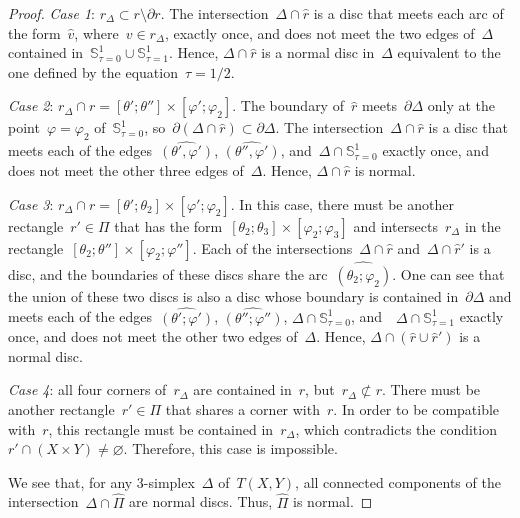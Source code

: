 \documentclass{amsart}
\theoremstyle{theorem}
\theoremstyle{remark}
\theoremstyle{definition}
\numberwithin{equation}{section}
\numberwithin{figure}{section}
\begin{document}
\begin{proof}
\smallskip\noindent\emph{Case 1}: $r_\Delta\subset r\setminus\partial r$.
The intersection~$\Delta\cap\widehat r$ is a disc that meets each arc of the form~$\widehat v$, where~$v\in r_\Delta$,
exactly once, and does not meet the two edges of~$\Delta$ contained in~$\mathbb S^1_{\tau=0}\cup\mathbb
S^1_{\tau=1}$.
Hence, $\Delta\cap\widehat r$ is a normal disc in~$\Delta$ equivalent to the one defined by the equation~$\tau=1/2$.

\smallskip\noindent\emph{Case 2}: $r_\Delta\cap r=[\theta';\theta'']\times[\varphi';\varphi_2]$.
The boundary of~$\widehat r$ meets~$\partial\Delta$ only at the point~$\varphi=\varphi_2$ of~$\mathbb S^1_{\tau=0}$,
so~$\partial(\Delta\cap\widehat r)\subset\partial\Delta$.
The intersection~$\Delta\cap\widehat r$ is a disc that meets each of the edges~$\widehat{(\theta',\varphi')}$,
$\widehat{(\theta'',\varphi')}$, and~$\Delta\cap\mathbb S^1_{\tau=0}$ exactly once,
and does not meet the other three edges of~$\Delta$. Hence, $\Delta\cap\widehat r$ is normal.

\smallskip\noindent\emph{Case 3}: $r_\Delta\cap r=[\theta';\theta_2]\times[\varphi';\varphi_2]$.
In this case, there must be another rectangle~$r'\in\Pi$ that has the form~$[\theta_2;\theta_3]\times[\varphi_2;\varphi_3]$
and intersects~$r_\Delta$ in the rectangle~$[\theta_2;\theta'']\times[\varphi_2;\varphi'']$.
Each of the intersections~$\Delta\cap\widehat r$ and~$\Delta\cap\widehat r'$ is a disc, and the boundaries
of these discs share the arc~$\widehat{(\theta_2;\varphi_2)}$. One can see that the union of these two discs
is also a disc whose boundary is contained in~$\partial\Delta$ and
meets each of the edges~$\widehat{(\theta';\varphi')}$, $\widehat{(\theta'';\varphi'')}$,
$\Delta\cap\mathbb S^1_{\tau=0}$, and~~$\Delta\cap\mathbb S^1_{\tau=1}$ exactly once,
and does not meet the other two edges of~$\Delta$. Hence, $\Delta\cap(\widehat r\cup\widehat r')$
is a normal disc.

\smallskip\noindent\emph{Case 4}: all four corners of~$r_\Delta$ are contained in~$r$, but~$r_\Delta\not\subset r$.
There must be another rectangle~$r'\in\Pi$ that shares a corner with~$r$. In order to be compatible with~$r$,
this rectangle must be contained in~$r_\Delta$, which contradicts the condition~$r'\cap(X\times Y)\ne\varnothing$.
Therefore, this case is impossible.

\smallskip
We see that, for any $3$-simplex~$\Delta$ of~$T(X,Y)$,
all connected components of the intersection~$\Delta\cap\widehat\Pi$ are normal discs. Thus, $\widehat\Pi$ is normal.
\end{proof}
\end{document}
